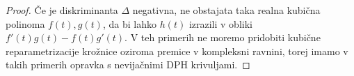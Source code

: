 \documentclass[12pt,a4paper,twoside]{article}
\theoremstyle{definition} %
\newtheorem{definicija}{Definicija}[section]
\theoremstyle{plain} %
\newtheorem{trditev}[definicija]{Trditev}
\numberwithin{equation}{section}  %
\begin{document}
\begin{proof}
	Če je diskriminanta $\Delta$ negativna, ne obstajata taka realna kubična polinoma $f(t),g(t)$, da bi lahko $h(t)$ izrazili v obliki $f'(t)g(t)-f(t)g'(t).$ V teh primerih ne moremo pridobiti kubične reparametrizacije krožnice oziroma premice v kompleksni ravnini, torej imamo v takih primerih opravka s nevijačnimi DPH krivuljami.
\end{proof}




%
%
%
\end{document}

